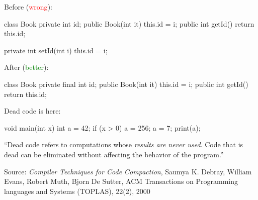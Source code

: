 \documentclass{article}
\begin{document}

\begin{multicols}{2}
Before (\textcolor{red}{wrong}):\par
{\small\begin{ffcode}
class Book
  private int id;
  public Book(int it)
    this.id = i;
  public int getId()
    return this.id;

  private int setId(int i)
    this.id = i;
\end{ffcode}
}
\par\columnbreak\par
After (\textcolor{green}{better}):\par
{\small\begin{ffcode}
class Book
  private final int id;
  public Book(int it)
    this.id = i;
  public int getId()
    return this.id;
\end{ffcode}
}
\end{multicols}
\plush{}


\begin{multicols}{2}
Dead code is here:\par
{\small\begin{ffcode}
void main(int x) {
  int a = 42;
  if (x > 0) {
    a = 256;
  }
  a = 7;
  print(a);
}
\end{ffcode}
}
\par\columnbreak\par
``Dead code refers to computations whose \emph{results are never used}. Code that is dead can be eliminated without affecting the behavior of the program.''\par
{\scriptsize Source: \textit{Compiler Techniques for Code Compaction}, Saumya K. Debray, William Evans, Robert Muth, Bjorn De Sutter, ACM Transactions on Programming languages and Systems (TOPLAS), 22(2), 2000 \par}
\end{multicols}
\plush{}
\end{document}
